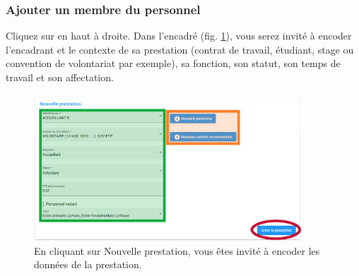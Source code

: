 \subsubsection{Ajouter un membre du personnel}
Cliquez sur  en haut à droite. Dans l'encadré  (fig. \ref{fig:aes_new_prestation}), vous serez invité à encoder l'encadrant et le contexte de sa prestation (contrat de travail, étudiant, stage ou convention de volontariat par exemple), sa fonction, son statut, son temps de travail et son affectation. 

\begin{figure}[htbp]
    \centering
    \includegraphics[width=10cm]{Images/aes/add_prestation.png}
    \caption{En cliquant sur Nouvelle prestation, vous êtes invité à encoder les données de la prestation.}
    \label{fig:aes_new_prestation}
\end{figure}


